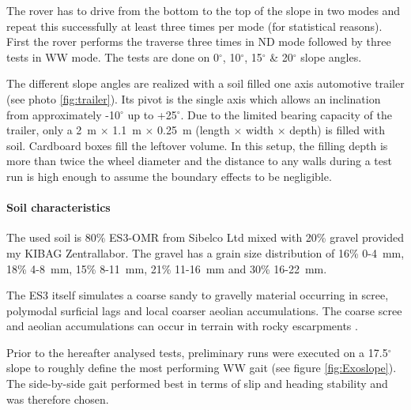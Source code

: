 \documentclass[a4paper,twocolumn]{esapub2005} %
\begin{document}
The rover has to drive from the bottom to the top
of the slope in two modes and repeat this successfully at least three times per mode (for statistical reasons).
First the rover performs the traverse three times in ND mode
followed by three tests in WW mode. The tests are done on
0$^{\circ}$, 10$^{\circ}$, 15$^{\circ}$ \& 20$^{\circ}$ slope angles. 

The different slope angles are realized with a soil filled one axis automotive trailer (see photo
\ref{fig:trailer}). Its pivot is the single axis which allows an inclination
from approximately -10$^{\circ}$ up to +25$^{\circ}$. Due to the limited
bearing capacity of the trailer, only a 2~\unit{m} $\times$ 1.1~\unit{m}
$\times$ 0.25~\unit{m} (length $\times$ width $\times$ depth) is filled with
soil. Cardboard boxes fill the leftover volume. In this setup, the filling
depth is more than twice the wheel diameter and the distance to any walls
during a test run is high enough to assume  the boundary effects to be
negligible.  

\paragraph{Soil characteristics} The used soil is 80\% ES3-OMR from Sibelco Ltd mixed with 20\%
gravel provided my KIBAG Zentrallabor. The gravel has a grain size distribution
of 16\% 0-4~\unit{mm}, 18\% 4-8~\unit{mm}, 15\% 8-11~\unit{mm}, 21\%
11-16~\unit{mm} and 30\% 16-22~\unit{mm}.  

The ES3 itself simulates a coarse sandy to gravelly material occurring in
scree, polymodal surficial lags and local coarser aeolian accumulations. The
coarse scree and aeolian accumulations can occur in terrain with rocky
escarpments \cite{michaud2014}.




Prior to the hereafter analysed tests, preliminary runs were executed on a
17.5$^{\circ}$ slope to roughly define the most performing WW gait (see figure
\ref{fig:Exoslope}).  The side-by-side gait performed best in terms of slip and
heading stability and was therefore chosen. 
\end{document}
